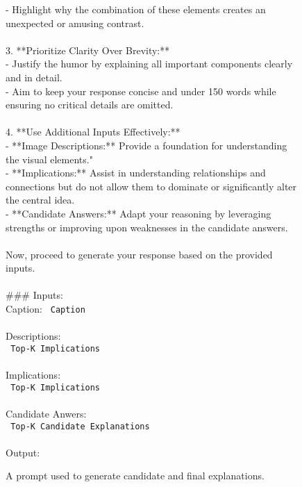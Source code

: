 \begin{figure*}[t]
\begin{tcolorbox}
- Highlight why the combination of these elements creates an unexpected or amusing contrast.\\
\\
3. **Prioritize Clarity Over Brevity:**  \\
- Justify the humor by explaining all important components clearly and in detail.  \\
- Aim to keep your response concise and under 150 words while ensuring no critical details are omitted.  \\
\\
4. **Use Additional Inputs Effectively:**\\
- **\text{[}Image Descriptions\text{]}:** Provide a foundation for understanding the visual elements."   \\
- **\text{[}Implications\text{]}:** Assist in understanding relationships and connections but do not allow them to dominate or significantly alter the central idea.\\
- **\text{[}Candidate Answers\text{]}:** Adapt your reasoning by leveraging strengths or improving upon weaknesses in the candidate answers.\\
\\
Now, proceed to generate your response based on the provided inputs.\\
\\
\#\#\# Inputs:\\
\text{[}Caption\text{]}: \texttt{\text{[} Caption \text{]}}\\
\\
\text{[}Descriptions\text{]}:\\
\texttt{\text{[} Top-K Implications \text{]}}\\
\\
\text{[}Implications\text{]}:\\
\texttt{\text{[} Top-K Implications \text{]}}\\
\\
\text{[}Candidate Anwers\text{]}:\\
\texttt{\text{[} Top-K Candidate Explanations \text{]}}\\
\\
\text{[}Output\text{]}:\\

\end{tcolorbox}
\caption{A prompt used to generate candidate and final explanations.} %
\label{fig:cand-prompt}
\end{figure*}


